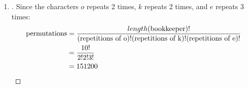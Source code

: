 \documentclass[paper=usletter, fontsize=12pt]{article}
\begin{document}
\begin{enumerate}
\begin{enumerate}
            \item
            \begin{proof}[\unskip\nopunct]
                Since the characters $o$ repeats 2 times, $k$ repeats 2 times,
                and $e$ repeats 3 times:
                \begin{align*}
                    \text{permutations} & = \frac{length(\text{bookkeeper})!}{(\text{repetitions of o})!(\text{repetitions of k})!(\text{repetitions of e})!} \\
                    & = \frac{10!}{2!2!3!} \\
                    & = 151200 \qedhere
                \end{align*}
            \end{proof}
            \vspace{0.2in}

        \end{enumerate}

    \end{enumerate}
\end{document}
